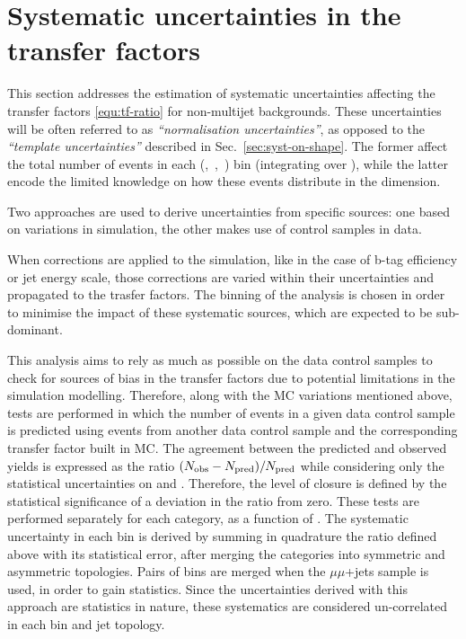 \section{Systematic uncertainties in the transfer factors}
\label{sec:systematics}

This section addresses the estimation of systematic uncertainties affecting the transfer factors \ref{equ:tf-ratio} 
for non-multijet backgrounds. 
These uncertainties will be often referred to as \textit{``normalisation uncertainties''}, 
as opposed to the \textit{``template uncertainties''} described in Sec.~\ref{sec:syst-on-shape}. 
The former affect the total number of events in each (\njet,~\nb,~\scalht) bin (integrating over \mht), 
while the latter encode the limited knowledge on how these events distribute in the \mht dimension.

Two approaches are used to derive uncertainties from specific sources:
one based on variations in simulation, the other makes use of control samples in data.

When corrections are applied to the simulation, like in the case of b-tag efficiency 
or jet energy scale, those corrections are varied within their uncertainties and propagated to 
the trasfer factors. The binning of the analysis is chosen in order to minimise the impact of 
these systematic sources, which are expected to be sub-dominant.

This analysis aims to rely as much as possible on the data control samples
to check for sources of bias in the transfer factors due to potential limitations in
the simulation modelling. 
Therefore, along with the MC variations mentioned above, tests are performed 
in which the number of events in a given data control sample is predicted 
using events from another data control sample and the corresponding transfer factor built in MC. 
The agreement between the predicted and observed yields is
expressed as the ratio $(\nobs - \npre)/\npre$ while considering only
the statistical uncertainties on \npre and \nobs. Therefore, the level
of closure is defined by the statistical significance of a deviation
in the ratio from zero.
These tests are performed separately for each \nj category, as a function of \scalht. 
The systematic uncertainty in each \scalht bin is derived by summing in quadrature the ratio 
defined above with its statistical error, after merging the \nj categories into symmetric and asymmetric topologies. 
Pairs of \scalht bins are merged when the $\mu\mu$+jets sample is used, in order to gain statistics. 
Since the uncertainties derived with this approach are statistics in nature, 
these systematics are considered un-correlated in each \scalht bin and jet topology. 

